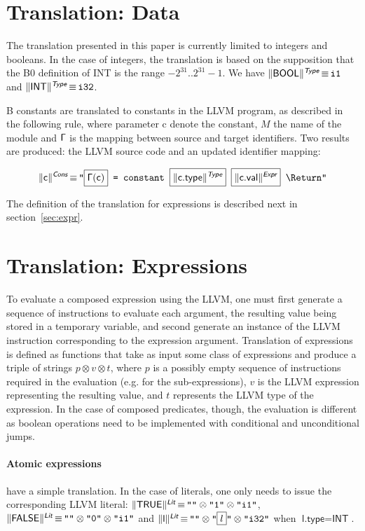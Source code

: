 \documentclass{llncs}
\newcommand{\trad}[2]{\ensuremath{\lVert \textsf{#1} \rVert^{\textit{#2}}}}
\newcommand{\nl}[0]{\text{\Return}}
\DeclareMathOperator{\isdef}{\equiv}
\newcommand{\llvm}[1]{\texttt{#1}}
\newcommand{\B}[1]{\textsf{#1}}
\newcommand{\PH}[1]{\framebox{$#1$}}
\newcommand{\sep}[0]{\otimes}
\newcommand{\Global}[0]{\ensuremath{\sf\Gamma}}
\begin{document}
\section{Translation: Data}
\label{sec:data}

The translation presented in this paper is currently limited to integers and
booleans. In the case of integers, the translation is based on the supposition
that the B0 definition of \B{INT} is the range $-2^{31}.. 2^{31}-1$. We have
$\trad{BOOL}{\B{Type}} \isdef \llvm{i1}$ and $\trad{INT}{\B{Type}} \isdef
\llvm{i32}$.

B constants are translated to constants in the LLVM program, as described in the
following rule, where parameter \B{c} denote the constant, $M$ the name of the
module and $\Global$ is the mapping between source and target identifiers. Two
results are produced: the LLVM source code and an updated identifier mapping:
\begin{small}
\begin{align*}
  \trad{\B{c}}{\B{Cons}} \isdef \llvm{"\PH{\Global(\B{c})} = constant \PH{\trad{\B{c.type}}{\B{Type}}} \PH{\trad{\B{c.val}}{\B{Expr}}} \nl"}
\end{align*}
\end{small}
The definition of the translation for expressions is described next in
section~\ref{sec:expr}.

\section{Translation: Expressions
  \label{sec:expr}}

To evaluate a composed expression using the LLVM, one must first generate a
sequence of instructions to evaluate each argument, the resulting value being
stored in a temporary variable, and second generate an instance of the LLVM
instruction corresponding to the expression argument.  Translation of
expressions is defined as functions that take as input some class of expressions
and produce a triple of strings $p \sep v \sep t$, where $p$ is a possibly empty
sequence of instructions required in the evaluation (e.g.  for the
sub-expressions), $v$ is the LLVM expression representing the resulting value,
and $t$ represents the LLVM type of the expression. In the case of composed
predicates, though, the evaluation is different as boolean operations need to be
implemented with conditional and unconditional jumps.

\paragraph{Atomic expressions} have a simple translation. In the case of
literals, one only needs to issue the corresponding LLVM literal:
$\trad{TRUE}{\B{Lit}} \isdef \llvm{""} \sep \llvm{"1"} \sep \llvm{"i1"}$,
$\trad{FALSE}{\B{Lit}} \isdef \llvm{""} \sep \llvm{"0"} \sep \llvm{"i1"}$ and
$\trad{l}{\B{Lit}} \isdef \llvm{""} \sep \llvm{"\PH{l}"} \sep \llvm{"i32"}$ when
$\B{l.type} = \B{INT}$.
\end{document}
